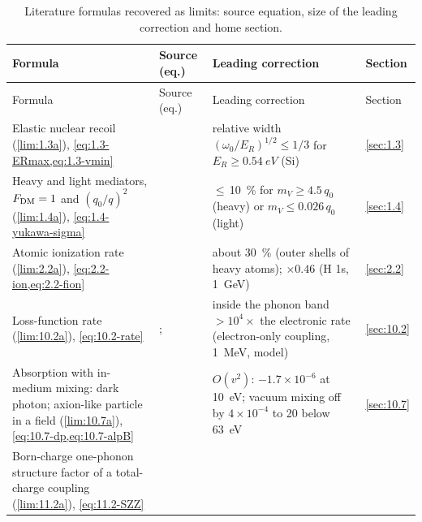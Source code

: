 {\footnotesize
\setlength{\tabcolsep}{4pt}
\renewcommand{\arraystretch}{1.1}
\begin{longtable}{@{}>{\raggedright\arraybackslash}p{}>{\raggedright\arraybackslash}p{}>{\raggedright\arraybackslash}p{}>{\raggedright\arraybackslash}p{}@{}}
\caption{Literature formulas recovered as limits: source equation, size of the leading correction and home section.}\label{tab:F-rows}\\
\toprule
Formula & Source (eq.) & Leading correction & Section \\
\midrule
\endfirsthead
\toprule
Formula & Source (eq.) & Leading correction & Section \\
\midrule
\endhead
\bottomrule
\endlastfoot
Elastic nuclear recoil (\cref{lim:1.3a}), \cref{eq:1.3-ERmax,eq:1.3-vmin}
& \cite[Eqs.~(77), (78)]{lin2019tasi}
& relative width $(\omega_0/E_R)^{1/2} \le 1/3$ for $E_R \ge \SI{0.54}{eV}$ (Si)
& \cref{sec:1.3} \\
Heavy and light mediators, $F_{\mathrm{DM}} = 1$ and $(q_0/q)^2$ (\cref{lim:1.4a}), \cref{eq:1.4-yukawa-sigma}
& \cite[Eq.~(15) and the display above it]{essig2012direct}
& $\le$\,\SI{10}{\percent} for $m_V \ge 4.5\,q_0$ (heavy) or $m_V \le 0.026\,q_0$ (light)
& \cref{sec:1.4} \\
Atomic ionization rate (\cref{lim:2.2a}), \cref{eq:2.2-ion,eq:2.2-fion}
& \cite[Eqs.~(5), (6); Eq.~(1) for the Fermi factor]{essig2012direct}
& about \SI{30}{\percent} (outer shells of heavy atoms); $\times0.46$ (H 1s, \SI{1}{GeV})
& \cref{sec:2.2} \\
Loss-function rate (\cref{lim:10.2a}), \cref{eq:10.2-rate}
& \cite[Eqs.~(6) and (13)]{knapen2021dark}; \cite[Eq.~(1)]{hochberg2021determining}
& inside the phonon band $>10^4\times$ the electronic rate (electron-only coupling, \SI{1}{MeV}, model)
& \cref{sec:10.2} \\
Absorption with in-medium mixing: dark photon; axion-like particle in a field (\cref{lim:10.7a}), \cref{eq:10.7-dp,eq:10.7-alpB}
& \cites[Eqs.~(6) and (7)]{hochberg2017absorption}[Eqs.~(2), (18) and (20)]{an2015direct}[Eqs.~(38)--(40)]{mitridate2021dark}[Eqs.~(3), (6) and (7)]{berlin2024absorption}
& $O(v^2)$: $-1.7\times10^{-6}$ at \SI{10}{eV}; vacuum mixing off by $4\times10^{-4}$ to 20 below \SI{63}{eV}
& \cref{sec:10.7} \\
Born-charge one-phonon structure factor of a total-charge coupling (\cref{lim:11.2a}), \cref{eq:11.2-SZZ}

\end{longtable}}
